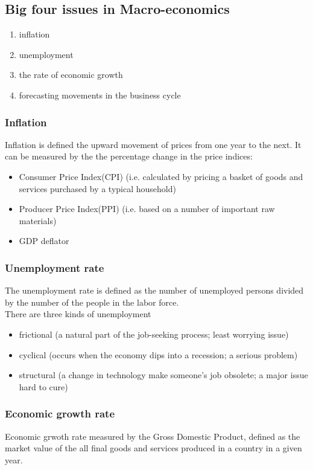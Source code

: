 \documentclass[a4paper,13pt]{report}
\begin{document}
\subsection{Big four issues in Macro-economics}
\begin{enumerate}
    \item inflation
    \item unemployment
    \item the rate of economic growth
    \item forecasting movements in the business cycle
\end{enumerate}

\subsubsection{Inflation}
Inflation is defined the upward movement of prices from one year to the next. It can be measured by the the percentage change in the price indices:
\begin{itemize}
    \item Consumer Price Index(CPI) (i.e. calculated by pricing a basket of goods and services purchased by a typical household)
    \item Producer Price Index(PPI) (i.e. based on a number of important raw materials)
    \item GDP deflator
\end{itemize}

\subsubsection{Unemployment rate}
The unemployment rate is defined as the number of unemployed persons divided by the number of the people in the labor force.\\
There are three kinds of unemployment
\begin{itemize}
    \item frictional (a natural part of the job-seeking process; least worrying issue)
    \item cyclical (occurs when the economy dips into a recession; a serious problem)
    \item structural (a change in technology make someone's job obsolete; a major issue hard to cure)
\end{itemize}

\subsubsection{Economic growth rate}
Economic grwoth rate measured by the Gross Domestic Product, defined as the market value of the all final goods and services produced in a country in a given year. \\
\end{document}
